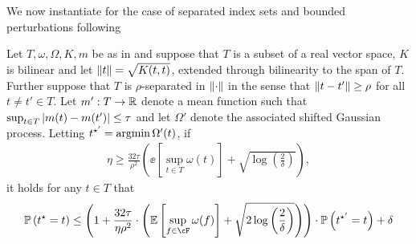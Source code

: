 We now instantiate  for the case of separated index sets and bounded perturbations following \citet[Corollary 1]{block2024oracle}
\begin{theorem}\label{thm:separated_privacy}
    Let $T, \omega, \Omega, K, m$ be as in  and suppose that $T$ is a subset of a real vector space, $K$ is bilinear and let $\left\|t\right\| = \sqrt{K(t,t)}$, extended through bilinearity to the span of $T$.  Further suppose that $T$ is $\rho$-separated in $\left\|\cdot\right\|$ in the sense that $\left\|t - t'\right\| \geq \rho$ for all $t \neq t' \in T$.  Let $m' : T \to \mathbb{R}$ denote a mean function such that $\sup_{t \in T} \left|m(t) - m(t')\right| \leq \tau$ and let $\Omega'$ denote the associated shifted Gaussian process.  Letting $t^{\star'} = \operatorname*{argmin} \Omega'(t)$, if
    \begin{align}\label{eq:separated_privacy_eta_lb}
        \eta \geq \frac{32\tau}{\rho^2} \left( \ee\left[ \sup_{t \in T} \omega(t) \right] + \sqrt{\log\left( \frac 2\delta \right)} \right),
    \end{align}
    it holds for any $t \in T$ that
    \begin{align}
        \pp\left( \tstar = t \right) \leq \left( 1 + \frac{32\tau}{\eta \rho^2} \cdot \left( \ee\left[ \sup_{f \in \cF} \omega(f) \right] + \sqrt{2 \log\left( \frac 2\delta \right)} \right) \right) \cdot \pp\left( \tstarp = t \right) + \delta
    \end{align}
\end{theorem}
